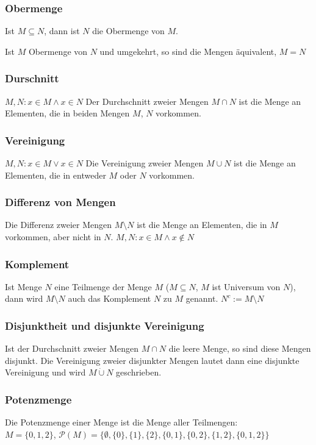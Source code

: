 \subsubsection{Obermenge}
Ist $M \subseteq N$, dann ist $N$ die Obermenge von $M$.

Ist $M$ Obermenge von $N$ und umgekehrt, so sind die Mengen äquivalent, $M = N$

\subsubsection{Durschnitt}
$M,N : x \in M \wedge x \in N$
Der Durchschnitt zweier Mengen $M \cap N$ ist die Menge an Elementen, die in beiden Mengen $M$, $N$ vorkommen.

\subsubsection{Vereinigung}
$M,N: x \in M \vee x \in N$
Die Vereinigung zweier Mengen $M \cup N$ ist die Menge an Elementen, die in entweder $M$ oder $N$ vorkommen.

\subsubsection{Differenz von Mengen}
Die Differenz zweier Mengen $M\setminus N$ ist die Menge an Elementen, die in $M$ vorkommen, aber nicht in $N$.
$M,N : x \in M \wedge x \notin N$

\subsubsection{Komplement}
Ist Menge $N$ eine Teilmenge der Menge $M$ ($M \subseteq N$, $M$ ist Universum von $N$), dann wird $M \setminus N$ auch das Komplement $N$ zu $M$ genannt. $N^c := M \setminus N$

\subsubsection{Disjunktheit und disjunkte Vereinigung}
Ist der Durchschnitt zweier Mengen $M \cap N$ die leere Menge, so sind diese Mengen disjunkt. Die Vereinigung zweier disjunkter Mengen lautet dann eine disjunkte Vereinigung und wird $M \dot{\cup} N$ geschrieben.

\subsubsection{Potenzmenge}
Die Potenzmenge einer Menge ist die Menge aller Teilmengen:\\
$M = \{0,1,2\}$, $\mathcal{P}(M)= \{\emptyset, \{0\}, \{1\}, \{2\}, \{0,1\}, \{0,2\}, \{1,2\}, \{0,1,2\}\}$
